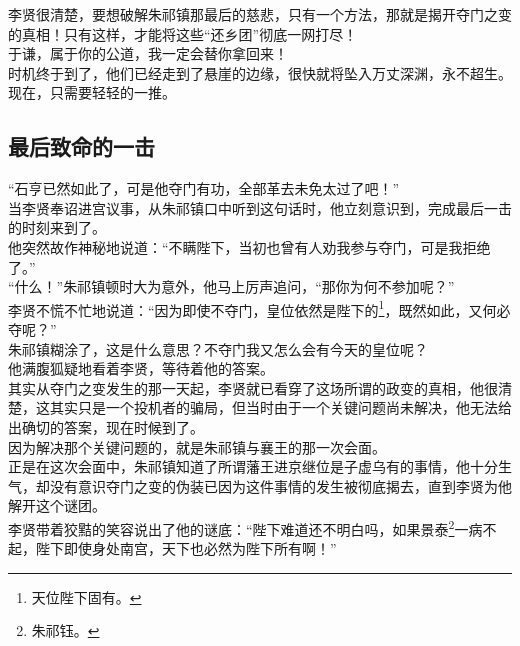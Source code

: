\begin{multicols}{\theparacolNo}
李贤很清楚，要想破解朱祁镇那最后的慈悲，只有一个方法，那就是揭开夺门之变的真相！只有这样，才能将这些“还乡团”彻底一网打尽！\\

于谦，属于你的公道，我一定会替你拿回来！\\

时机终于到了，他们已经走到了悬崖的边缘，很快就将坠入万丈深渊，永不超生。\\

现在，只需要轻轻的一推。\\

\subsection{最后致命的一击}
“石亨已然如此了，可是他夺门有功，全部革去未免太过了吧！”\\

当李贤奉诏进宫议事，从朱祁镇口中听到这句话时，他立刻意识到，完成最后一击的时刻来到了。\\

他突然故作神秘地说道：“不瞒陛下，当初也曾有人劝我参与夺门，可是我拒绝了。”\\

“什么！”朱祁镇顿时大为意外，他马上厉声追问，“那你为何不参加呢？”\\

李贤不慌不忙地说道：“因为即使不夺门，皇位依然是陛下的\footnote{天位陛下固有。}，既然如此，又何必夺呢？”\\

朱祁镇糊涂了，这是什么意思？不夺门我又怎么会有今天的皇位呢？\\

他满腹狐疑地看着李贤，等待着他的答案。\\

其实从夺门之变发生的那一天起，李贤就已看穿了这场所谓的政变的真相，他很清楚，这其实只是一个投机者的骗局，但当时由于一个关键问题尚未解决，他无法给出确切的答案，现在时候到了。\\

因为解决那个关键问题的，就是朱祁镇与襄王的那一次会面。\\

正是在这次会面中，朱祁镇知道了所谓藩王进京继位是子虚乌有的事情，他十分生气，却没有意识夺门之变的伪装已因为这件事情的发生被彻底揭去，直到李贤为他解开这个谜团。\\

李贤带着狡黠的笑容说出了他的谜底：“陛下难道还不明白吗，如果景泰\footnote{朱祁钰。}一病不起，陛下即使身处南宫，天下也必然为陛下所有啊！”\\


\end{multicols}

